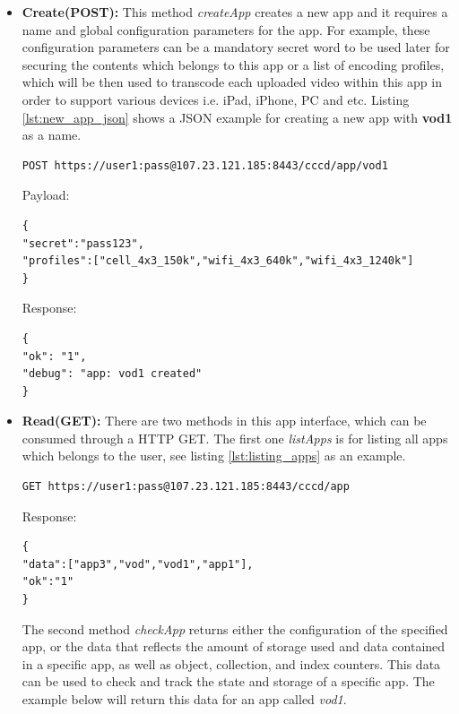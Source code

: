 \begin{itemize}
\item \textbf{Create(POST):} This method \textit{createApp} creates a new app and it requires a name and global configuration parameters for the app. For example, these configuration parameters can be a mandatory secret word to be used later for securing the contents which belongs to this app or a list of encoding profiles, which will be then used to transcode each uploaded video within this app in order to support various devices i.e. iPad, iPhone, PC and etc. Listing \ref{lst:new_app_json} shows a \ac{JSON} example for creating a new app with \textbf{vod1} as a name.

\begin{code}
\begin{verbatim}
POST https://user1:pass@107.23.121.185:8443/cccd/app/vod1
\end{verbatim}
Payload:
\begin{verbatim}
{
"secret":"pass123",
"profiles":["cell_4x3_150k","wifi_4x3_640k","wifi_4x3_1240k"]
}
\end{verbatim}
Response:
\begin{verbatim}
{
"ok": "1",
"debug": "app: vod1 created"
}
\end{verbatim}
\caption{Creating a new app}
\label{lst:new_app_json}
\end{code}

\item \textbf{Read(GET):} There are two methods in this app interface, which can be consumed through a \ac{HTTP} GET. The first one \textit{listApps} is for listing all apps which belongs to the user, see listing \ref{lst:listing_apps} as an example. 

\begin{code}
\begin{verbatim}
GET https://user1:pass@107.23.121.185:8443/cccd/app
\end{verbatim}
Response:
\begin{verbatim}
{
"data":["app3","vod","vod1","app1"],
"ok":"1"
}
\end{verbatim}
\caption{Listing all apps which belong to a user}
\label{lst:listing_apps}
\end{code}


The second method \textit{checkApp} returns either the configuration of the specified app, or the data that reflects the amount of storage used and data contained in a specific app, as well as object, collection, and index counters. This data can be used to check and track the state and storage of a specific app. The example below will return this data for an app called \textit{vod1}.


\end{itemize}
